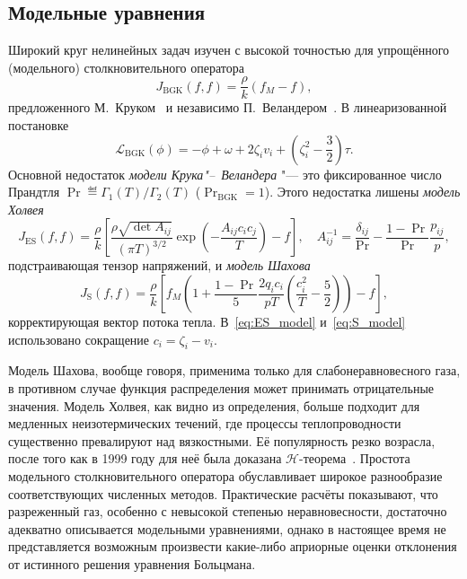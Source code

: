 \subsection{Модельные уравнения}

Широкий круг нелинейных задач изучен с высокой точностью для упрощённого (модельного) столкновительного оператора
\begin{equation}\label{eq:BGK}
    J_\mathrm{BGK}(f,f) = \frac{\rho}{k} (f_M-f),
\end{equation}
предложенного М.~Круком~\cite{Krook1954} и независимо П.~Веландером~\cite{Welander1954}.
В линеаризованной постановке
\begin{equation}\label{eq:linear_BGK}
    \mathcal{L}_\mathrm{BGK}(\phi) = -\phi + \omega + 2\zeta_i v_i + \left( \zeta_i^2 - \frac32 \right)\tau.
\end{equation}
Основной недостаток \emph{модели Крука"--~Веландера} "--- это фиксированное число Прандтля
\(\Pr \eqdef \Gamma_1(T)/\Gamma_2(T)\) (\(\Pr_\mathrm{BGK}=1\)).
Этого недостатка лишены \emph{модель Холвея}~\cite{Holway1966}
\begin{equation}\label{eq:ES_model}
    J_\mathrm{ES}(f,f) = \frac{\rho}{k} \left[\frac{\rho\sqrt{\det A_{ij}}}{(\pi T)^{3/2}}
        \exp\left(- \frac{A_{ij}c_i c_j}T \right) -f \right], \quad
    A_{ij}^{-1} = \frac{\delta_{ij}}{\Pr} - \frac{1-\Pr}{\Pr}\frac{p_{ij}}{p},
\end{equation}
подстраивающая тензор напряжений, и \emph{модель Шахова}~\cite{Shakhov1968}
\begin{equation}\label{eq:S_model}
    J_\mathrm{S}(f,f) = \frac{\rho}{k} \left[ f_M \left( 1+\frac{1-\Pr}{5}\frac{2q_ic_i}{pT}
        \left(\frac{c_i^2}{T}-\frac52\right) \right)-f\right],
\end{equation}
корректирующая вектор потока тепла.
В~\eqref{eq:ES_model} и~\eqref{eq:S_model} использовано сокращение \(c_i = \zeta_i-v_i\).

Модель Шахова, вообще говоря, применима только для слабонеравновесного газа,
в противном случае функция распределения может принимать отрицательные значения.
Модель Холвея, как видно из определения, больше подходит для медленных неизотермических течений,
где процессы теплопроводности существенно превалируют над вязкостными.
Её популярность резко возрасла, после того как в 1999 году для неё была доказана \(\mathcal{H}\)-теорема~\cite{Perthame2000}.
Простота модельного столкновительного оператора обуславливает широкое разнообразие соответствующих численных методов.
Практические расчёты показывают, что разреженный газ, особенно с невысокой степенью неравновесности, достаточно адекватно
описывается модельными уравнениями, однако в настоящее время не представляется возможным произвести какие-либо
априорные оценки отклонения от истинного решения уравнения Больцмана.

